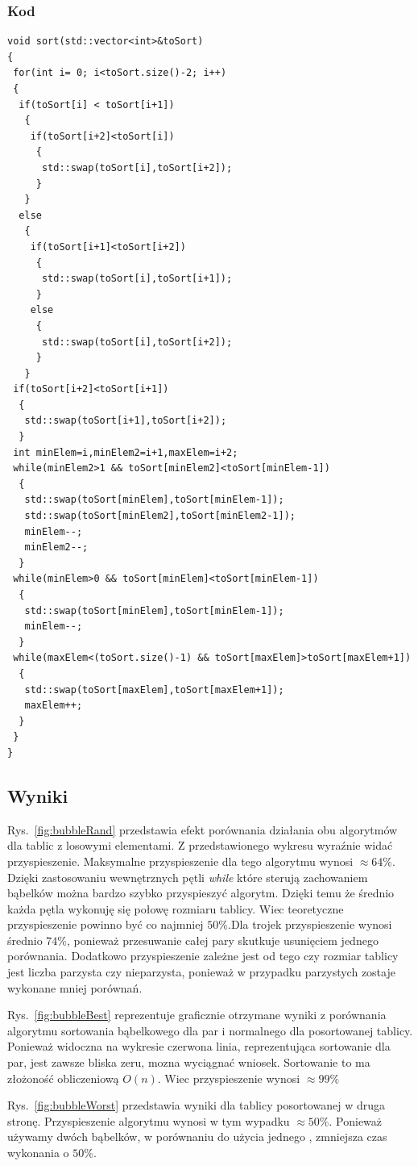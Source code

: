 \subsubsection{Kod}
\begin{lstlisting}[caption={Sortowanie bąbelkowe dla trzech elementow},label={lst:babelek}]
void sort(std::vector<int>&toSort)
{
 for(int i= 0; i<toSort.size()-2; i++)
 {
  if(toSort[i] < toSort[i+1])
   {
    if(toSort[i+2]<toSort[i])
     {
      std::swap(toSort[i],toSort[i+2]);
     }
   }
  else
   {
    if(toSort[i+1]<toSort[i+2])
     {
      std::swap(toSort[i],toSort[i+1]);
     }
    else
     {
      std::swap(toSort[i],toSort[i+2]);
     }
   }
 if(toSort[i+2]<toSort[i+1])
  {
   std::swap(toSort[i+1],toSort[i+2]);
  }
 int minElem=i,minElem2=i+1,maxElem=i+2;
 while(minElem2>1 && toSort[minElem2]<toSort[minElem-1])
  {
   std::swap(toSort[minElem],toSort[minElem-1]);
   std::swap(toSort[minElem2],toSort[minElem2-1]);
   minElem--;
   minElem2--;
  }
 while(minElem>0 && toSort[minElem]<toSort[minElem-1])
  {
   std::swap(toSort[minElem],toSort[minElem-1]);
   minElem--;
  }
 while(maxElem<(toSort.size()-1) && toSort[maxElem]>toSort[maxElem+1])
  {
   std::swap(toSort[maxElem],toSort[maxElem+1]);
   maxElem++;
  }
 }
}
\end{lstlisting}








\subsection{Wyniki}
\par Rys.~\ref{fig:bubbleRand} przedstawia efekt porównania działania obu algorytmów dla tablic z losowymi elementami. Z przedstawionego wykresu wyraźnie widać przyspieszenie. Maksymalne przyspieszenie dla tego algorytmu wynosi $\approx 64\%$. Dzięki zastosowaniu wewnętrznych pętli \textit{while} które sterują zachowaniem bąbelków można bardzo szybko przyspieszyć algorytm. Dzięki temu że średnio każda pętla wykonuję się połowę rozmiaru tablicy. Wiec teoretyczne przyspieszenie powinno być co najmniej $50 \% $.Dla trojek przyspieszenie wynosi średnio $74\%$, ponieważ przesuwanie całej pary skutkuje usunięciem jednego porównania. Dodatkowo przyspieszenie zależne jest od tego czy rozmiar tablicy jest liczba parzysta czy nieparzysta, ponieważ w przypadku parzystych zostaje wykonane mniej porównań.
\par Rys.~\ref{fig:bubbleBest} reprezentuje graficznie otrzymane wyniki z porównania algorytmu sortowania bąbelkowego dla par i normalnego dla posortowanej tablicy. Ponieważ widoczna na wykresie czerwona linia, reprezentująca sortowanie dla par, jest zawsze bliska zeru, mozna wyciągnać wniosek. Sortowanie to ma złożoność obliczeniową $O(n)$. Wiec przyspieszenie wynosi $\approx 99\%$
\par Rys.~\ref{fig:bubbleWorst} przedstawia wyniki dla tablicy posortowanej w druga stronę. Przyspieszenie algorytmu wynosi w tym wypadku $\approx 50\%$. Ponieważ używamy dwóch bąbelków, w porównaniu do użycia jednego , zmniejsza czas wykonania o $50\%$.


